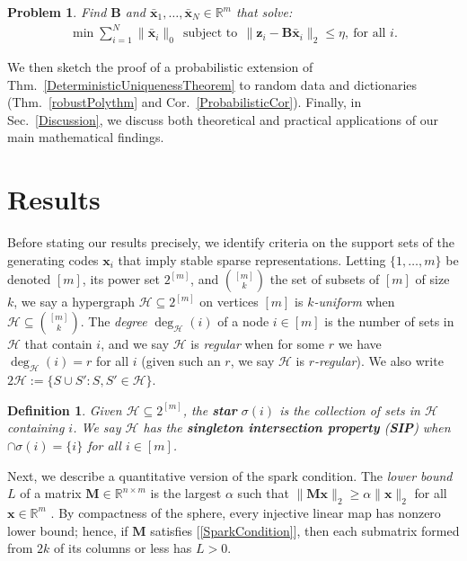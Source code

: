 \documentclass[9pt,twocolumn]{pnas-new}
\newtheorem{problem}{Problem}
\newtheorem{definition}{Definition}
\renewcommand{\eqref}[1]{\textnormal{[\ref{#1}]}}
\begin{document}
\begin{problem}\label{OptimizationProblem}
Find $\mathbf{B}$ and \mbox{$\mathbf{\bar x}_1, \ldots, \mathbf{\bar x}_N \in \mathbb{R}^m$} that solve:
\begin{align}\label{minsum}
\min \sum_{i = 1}^N \|\mathbf{\bar x}_i\|_0 \ \ 
\text{subject to} \ \ \|\mathbf{z}_i - \mathbf{B}\mathbf{\bar x}_i\|_2 \leq \eta, \ \text{for all $i$}.
\end{align}
\end{problem}
We then sketch the proof of a probabilistic extension of Thm.~\ref{DeterministicUniquenessTheorem} to random data and dictionaries (Thm.~\ref{robustPolythm} and Cor.~\ref{ProbabilisticCor}). Finally, in Sec.~\ref{Discussion}, we discuss both theoretical and practical applications of our main mathematical findings.

\section{Results}\label{Results}

Before stating our results precisely, we identify criteria on the support sets of the generating codes $\mathbf{x}_i$ that imply stable sparse representations. Letting $\{1, \ldots, m\}$ be denoted $[m]$, its power set $2^{[m]}$, and ${[m] \choose k}$ the set of subsets of $[m]$ of size $k$, we say a hypergraph $\mathcal{H} \subseteq 2^{[m]}$ on vertices $[m]$ is \textit{$k$-uniform} when $\mathcal{H} \subseteq {[m] \choose k}$. The \emph{degree} $\deg_\mathcal{H}(i)$ of a node $i \in [m]$ is the number of sets in $\mathcal{H}$ that contain $i$, and we say $\mathcal{H}$ is \emph{regular} when for some $r$ we have $\deg_\mathcal{H}(i) = r$ for all $i$ (given such an $r$, we say $\mathcal{H}$ is \textit{$r$-regular}). We also write $2\mathcal{H} := \{ S \cup S': S, S' \in \mathcal{H}\}$.

\begin{definition}\label{sip}
Given $\mathcal{H} \subseteq 2^{[m]}$, the \textbf{star} $\sigma(i)$ is the collection of sets in $\mathcal{H}$ containing $i$. We say $\mathcal{H}$ has the \textbf{singleton intersection property} (\textbf{SIP}) when $\cap \sigma(i) = \{i\}$ for all $i \in [m]$.
\end{definition}

Next, we describe a quantitative version of the spark condition. The \emph{lower bound} $L$ of a matrix $\mathbf{M} \in \mathbb R^{n \times m}$ is the largest $\alpha$ such that \mbox{$\|\mathbf{M}\mathbf{x}\|_2 \geq \alpha\|\mathbf{x}\|_2$} for all $\mathbf{x} \in \mathbb{R}^m$ \cite{Grcar10}. By compactness of the sphere, every injective linear map has nonzero lower bound; hence, if $\mathbf{M}$ satisfies \eqref{SparkCondition}, then each submatrix formed from $2k$ of its columns or less has $L > 0$. 
\end{document}
